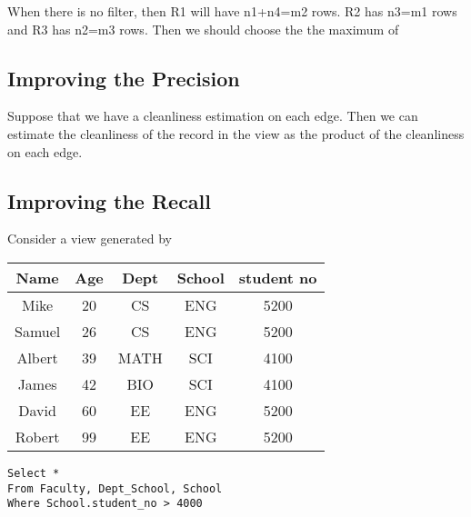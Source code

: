 When there is no filter, then R1 will have n1+n4=m2 rows. R2 has n3=m1 rows and R3 has n2=m3 rows. Then we should choose the the maximum of 

\subsection{Improving the Precision}
Suppose that we have a cleanliness estimation on each edge. Then we can estimate the cleanliness of the record in the view as the product of the cleanliness on each edge.

\subsection{Improving the Recall}
Consider a view generated by 

\begin{table}
\centering
\begin{tabular}{|c|c|c|c|c|} \hline
Name & Age & Dept & School & student no \\\hline
Mike & 20  & CS   & ENG &  5200 \\\hline
Samuel & 26  & CS   & ENG &  5200 \\\hline
Albert & 39  & MATH & SCI &  4100 \\\hline
James  & 42  & BIO  & SCI &  4100 \\\hline
David  & 60  & EE   & ENG &  5200 \\\hline
Robert & 99  & EE   & ENG &  5200 \\\hline
\end{tabular}
\end{table}

\lstset{language=SQL}
\begin{lstlisting}
Select *
From Faculty, Dept_School, School
Where School.student_no > 4000
\end{lstlisting}
\fi



